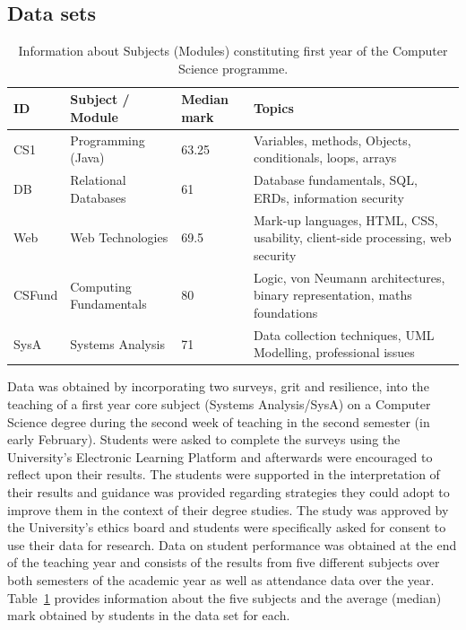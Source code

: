 \documentclass[sigconf]{acmart}
\begin{document}
\subsection {Data sets}
\begin{table}[ht]
\caption{Information about Subjects (Modules) constituting first year of the Computer Science programme.}
\begin{tabular}{llll}
\hline
\textbf{ID} & \textbf{Subject / Module} & \textbf{Median mark} & \textbf{Topics} \\
\hline
CS1  & Programming (Java)         & 63.25        & Variables, methods, Objects, conditionals, loops, arrays          \\
DB  & Relational Databases       & 61        & Database fundamentals, SQL, ERDs, information security          \\
Web  & Web Technologies         & 69.5      & Mark-up languages, HTML, CSS, usability, client-side processing, web security          \\
CSFund  & Computing Fundamentals & 80        & Logic, von Neumann architectures, binary representation, maths foundations          \\
SysA  & Systems Analysis        & 71        & Data collection techniques, UML Modelling, professional issues                 
\end{tabular}
\label{tab:module_info}
\end{table}

Data was obtained by incorporating two surveys, grit and resilience, into the teaching of a first year core subject (Systems Analysis/SysA) on a Computer Science degree during the second week of teaching in the second semester (in early February). Students were asked to complete the surveys using the University's Electronic Learning Platform and afterwards were encouraged to reflect upon their results. The students were supported in the interpretation of their results and guidance was provided regarding strategies they could adopt to improve them in the context of their degree studies. The study was approved by the University's ethics board and students were specifically asked for consent to use their data for research. Data on student performance was obtained at the end of the teaching year and consists of the results from five different subjects over both semesters of the academic year as well as attendance data over the year. Table~\ref{tab:module_info} provides information about the five subjects and the average (median) mark obtained by students in the data set for each.
\end{document}
